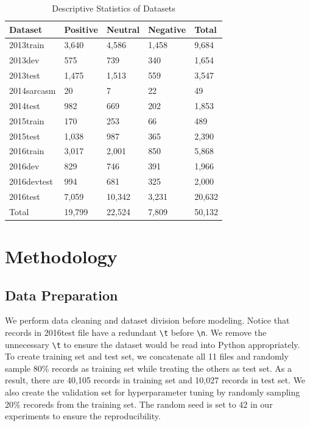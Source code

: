 \documentclass[runningheads]{llncs}
\begin{document}
\begin{table}[!ht]
	\centering
	\caption{Descriptive Statistics of Datasets} 
    \label{tab:3-stat}
	\begin{tabular}{lllll}
		\toprule
        \textbf{Dataset} & \textbf{Positive} & \textbf{Neutral} & \textbf{Negative} & \textbf{Total}\\ 
        \midrule
		2013train   & 3,640     & 4,586    & 1,458     & 9,684  \\
		2013dev     & 575      & 739     & 340      & 1,654  \\
		2013test    & 1,475     & 1,513    & 559      & 3,547  \\
		2014sarcasm & 20       & 7       & 22       & 49    \\
		2014test    & 982      & 669     & 202      & 1,853  \\
		2015train   & 170      & 253     & 66       & 489   \\
		2015test    & 1,038     & 987     & 365      & 2,390 \\
		2016train   & 3,017     & 2,001    & 850      & 5,868  \\
		2016dev     & 829      & 746     & 391      & 1,966  \\
		2016devtest & 994      & 681     & 325      & 2,000  \\
		2016test    & 7,059     & 10,342   & 3,231     & 20,632 \\ 
        \midrule
        Total   & 19,799  & 22,524  & 7,809  &   50,132\\
        \bottomrule
	\end{tabular}
\end{table}

\section{Methodology} \label{sec:method}
\subsection{Data Preparation}
We perform data cleaning and dataset division before modeling. Notice that records in 2016test file have a redundant \texttt{\textbackslash t} before \texttt{\textbackslash n}. We remove the unnecessary \texttt{\textbackslash t} to ensure the dataset would be read into Python appropriately. To create training set and test set, we concatenate all 11 files and randomly sample 80\% records as training set while treating the others as test set. As a result, there are 40,105 records in training set and 10,027 records in test set. We also create the validation set for hyperparameter tuning by randomly sampling 20\% recoreds from the training set. The random seed is set to 42 in our experiments to ensure the reproducibility.
\end{document}
